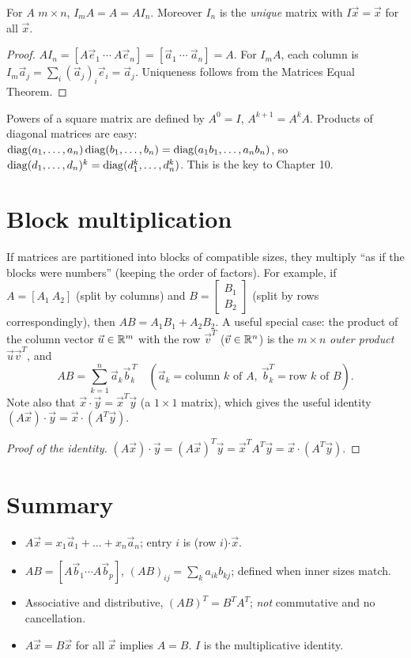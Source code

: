 \begin{theorem}
For $A$ $m\times n$, $I_mA=A=AI_n$. Moreover $I_n$ is the \emph{unique} matrix with $I\vec x=\vec x$
for all $\vec x$.
\end{theorem}
\begin{proof}
$AI_n=[A\vec e_1\ \cdots\ A\vec e_n]=[\vec a_1\ \cdots\ \vec a_n]=A$. For $I_mA$, each column is
$I_m\vec a_j = \sum_i (\vec a_j)_i\vec e_i=\vec a_j$. Uniqueness follows from the Matrices Equal Theorem.
\end{proof}

Powers of a square matrix are defined by $A^0=I$, $A^{k+1}=A^kA$. Products of diagonal matrices
are easy: $\operatorname{diag}(a_1,\dots,a_n)\operatorname{diag}(b_1,\dots,b_n)=\operatorname{diag}(a_1b_1,\dots,a_nb_n)$, so
$\operatorname{diag}(d_1,\dots,d_n)^k=\operatorname{diag}(d_1^k,\dots,d_n^k)$. This is the key to Chapter 10.

\section{Block multiplication}

If matrices are partitioned into blocks of compatible sizes, they multiply ``as if the blocks
were numbers'' (keeping the order of factors). For example, if $A=[A_1\ A_2]$ (split by columns)
and $B=\begin{bmatrix}B_1\\B_2\end{bmatrix}$ (split by rows correspondingly), then $AB=A_1B_1+A_2B_2$.
A useful special case: the product of the column vector $\vec u\in\mathbb{R}^m$ with the row $\vec v^T$
($\vec v\in\mathbb{R}^n$) is the $m\times n$ \emph{outer product} $\vec u\vec v^T$, and
\[
  AB = \sum_{k=1}^n \vec a_k\vec b_k^{\,T} \quad(\vec a_k=\text{column } k \text{ of } A,\ \vec b_k^T=\text{row } k\text{ of } B).
\]
Note also that $\vec x\cdot\vec y = \vec x^T\vec y$ (a $1\times1$ matrix), which gives the useful
identity $(A\vec x)\cdot\vec y = \vec x\cdot(A^T\vec y)$.

\begin{proof}[Proof of the identity]
$(A\vec x)\cdot\vec y = (A\vec x)^T\vec y = \vec x^TA^T\vec y = \vec x\cdot(A^T\vec y)$.
\end{proof}

\section*{Summary}
\begin{itemize}
  \item $A\vec x=x_1\vec a_1+\dots+x_n\vec a_n$; entry $i$ is (row $i$)$\cdot\vec x$.
  \item $AB=[A\vec b_1\cdots A\vec b_p]$, $(AB)_{ij}=\sum_k a_{ik}b_{kj}$; defined when inner sizes match.
  \item Associative and distributive, $(AB)^T=B^TA^T$; \emph{not} commutative and no cancellation.
  \item $A\vec x=B\vec x$ for all $\vec x$ implies $A=B$. $I$ is the multiplicative identity.
\end{itemize}
